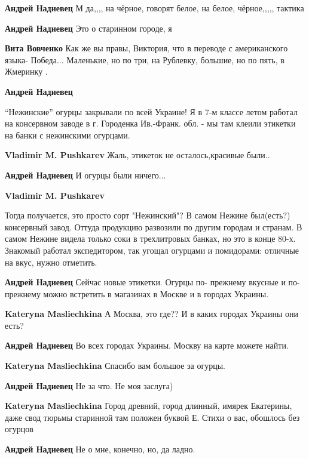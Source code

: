 \begin{itemize}
{\begin{itemize}
\begin{itemize}
\textbf{Андрей Надиевец} М да,,,, на чёрное, говорят белое, на белое, чёрное,,,,, тактика

\textbf{Андрей Надиевец} Это о старинном городе, я

\textbf{Вита Вовченко} Как же вы правы, Виктория, что в переводе с американского языка- Победа... Маленькие, но по три, на Рублевку, большие, но по пять, в Жмеринку .

\textbf{Андрей Надиевец} 

\enquote{Нежинские} огурцы закрывали по всей Украине! Я в 7-м классе летом
работал на консервном заводе в г. Городенка Ив.-Франк. обл. - мы там клеили
этикетки на банки с нежинскими огурцами.


\textbf{Vladimir M. Pushkarev} Жаль, этикеток не осталось,красивые были..

\textbf{Андрей Надиевец} И огурцы были ничего...

\textbf{Vladimir M. Pushkarev} 

Тогда получается, это просто сорт "Нежинский"? В самом Нежине был(есть?)
консервный завод. Оттуда продукцию развозили по другим городам и странам. В
самом Нежине видела только соки в трехлитровых банках, но это в конце 80-х.
Знакомый работал экспедитором, так угощал огурцами и помидорами: отличные на
вкус, нужно отметить.


\textbf{Андрей Надиевец} Сейчас новые этикетки. Огурцы по- прежнему вкусные и по-прежнему можно встретить в магазинах в
Москве и в городах Украины.

\textbf{Kateryna Masliechkina} А Москва, это где?? И в каких городах Украины они есть?

\textbf{Андрей Надиевец} Во всех городах Украины. Москву на карте можете найти.

\textbf{Kateryna Masliechkina} Спасибо вам большое за огурцы.

\textbf{Андрей Надиевец} Не за что. Не моя заслуга)

\textbf{Kateryna Masliechkina} Город древний, город длинный, имярек Екатерины, даже свод тюрьмы старинной там положен буквой Е. Стихи о вас, обошлось без огурцов

\textbf{Андрей Надиевец} Не о мне, конечно, но, да ладно.


\end{itemize}
\end{itemize}}
\end{itemize}
